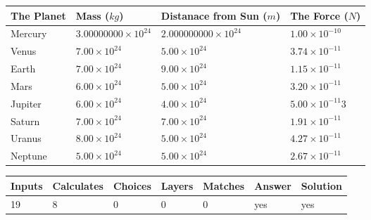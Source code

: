 \documentclass[12pt]{article}
\begin{document}
\vspace{0.2in}
 
 
\begin{tabular}{|l|l|l|l|}
\hline
The Planet & Mass ($kg$) & Distanace from Sun ($m$) & The Force ($N$)\\
\hline
Mercury  &
           $ %
3.00000000 \times 10^{24}  $   &
             $ %
2.000000000 \times 10^{24}$    & $ %
1.00 \times 10^{-10} $
\\  \hline
Venus    &
           $  %
7.00 \times 10^{24}  $     &
             $ %
5.00 \times 10^{24} $    & $ %
3.74 \times 10^{-11} $
\\  \hline
Earth    &
           $  %
7.00 \times 10^{24}$     &
             $ %
9.00 \times 10^{24} $    & $ %
1.15 \times 10^{-11} $
\\   \hline
Mars     &
           $  %
6.00 \times 10^{24} $     &
             $ %
5.00 \times 10^{24}$    & $ %
3.20 \times 10^{-11} $
\\   \hline
Jupiter  &
           $  %
6.00 \times 10^{24}  $    &
             $ %
4.00 \times 10^{24} $    & $ %
5.00 \times 10^{-11}3 $
\\  \hline
Saturn   &
           $  %
7.00 \times 10^{24}   $    &
             $ %
7.00 \times 10^{24}  $    & $ %
1.91 \times 10^{-11} $
\\  \hline
Uranus   &
           $  %
8.00 \times 10^{24} $    &
             $ %
5.00 \times 10^{24}$    & $ %
4.27 \times 10^{-11} $
\\  \hline
Neptune  &
           $  %
5.00 \times 10^{24}  $    &
             $ %
5.00 \times 10^{24} $    & $ %
2.67 \times 10^{-11} $
\\  \hline
 
\end{tabular}
 
 
 
 
\noindent{}
 
 

 
\vspace{0.3in}
   
   
   
   
\noindent\begin{tabular}{|l|l|l|l|l|l|l|}
 \hline
Inputs & Calculates & Choices & Layers & Matches & Answer & Solution \\ \hline
          19 & 
           8 & 
           0
  & 
           0 & 
           0 & 
  yes & 
  yes 
  \\ \hline
 \end{tabular}
   
\end{document}
